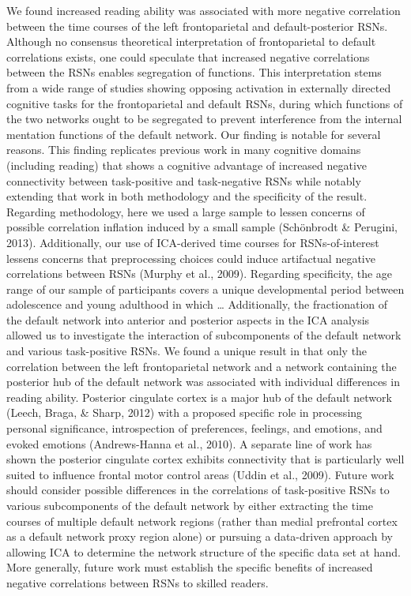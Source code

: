 We found increased reading ability was associated with more negative correlation between the time courses of the left frontoparietal and default-posterior RSNs. Although no consensus theoretical interpretation of frontoparietal to default correlations exists, one could speculate that increased negative correlations between the RSNs enables segregation of functions. This interpretation stems from a wide range of studies showing opposing activation in externally directed cognitive tasks for the frontoparietal and default RSNs, during which functions of the two networks ought to be segregated to prevent interference from the internal mentation functions of the default network. Our finding is notable for several reasons. This finding replicates previous work in many cognitive domains (including reading) that shows a cognitive advantage of increased negative connectivity between task-positive and task-negative RSNs while notably extending that work in both methodology and the specificity of the result. Regarding methodology, here we used a large sample to lessen concerns of possible correlation inflation induced by a small sample (Schönbrodt & Perugini, 2013). Additionally, our use of ICA-derived time courses for RSNs-of-interest lessens concerns that preprocessing choices could induce artifactual negative correlations between RSNs (Murphy et al., 2009). Regarding specificity, the age range of our sample of participants covers a unique developmental period between adolescence and young adulthood in which …  Additionally, the fractionation of the default network into anterior and posterior aspects in the ICA analysis allowed us to investigate the interaction of subcomponents of the default network and various task-positive RSNs. We found a unique result in that only the correlation between the left frontoparietal network and a network containing the posterior hub of the default network was associated with individual differences in reading ability. Posterior cingulate cortex is a major hub of the default network (Leech, Braga, & Sharp, 2012) with a proposed specific role in processing personal significance, introspection of preferences, feelings, and emotions, and evoked emotions (Andrews-Hanna et al., 2010). A separate line of work has shown the posterior cingulate cortex exhibits connectivity that is particularly well suited to influence frontal motor control areas (Uddin et al., 2009). Future work should consider possible differences in the correlations of task-positive RSNs to various subcomponents of the default network by either extracting the time courses of multiple default network regions (rather than medial prefrontal cortex as a default network proxy region alone) or pursuing a data-driven approach by allowing ICA to determine the network structure of the specific data set at hand. More generally, future work must establish the specific benefits of increased negative correlations between RSNs to skilled readers.

